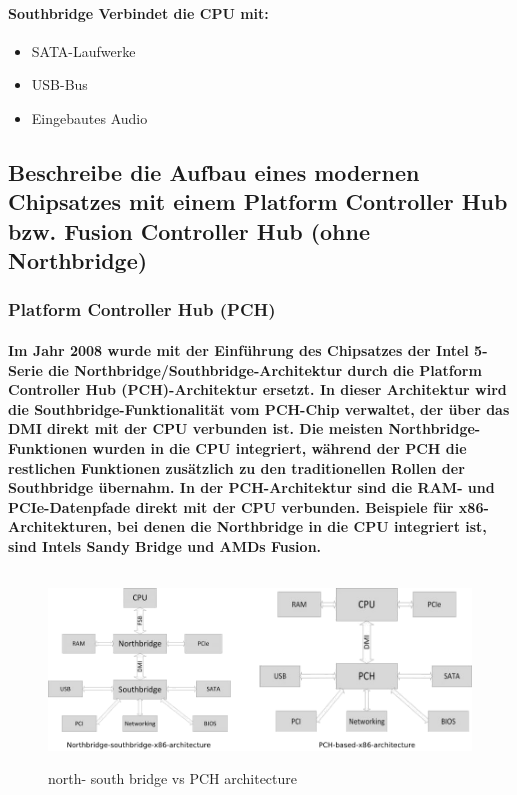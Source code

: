 \documentclass[a4paper]{article}
\begin{document}
    \paragraph{\color{red}Southbridge Verbindet die CPU mit:}
    \begin{itemize}
        \color{magenta}
        \item SATA-Laufwerke
        \item USB-Bus
        \item Eingebautes Audio
    \end{itemize}

    \subsection{\color{red}Beschreibe die Aufbau eines modernen Chipsatzes mit einem Platform Controller Hub bzw. Fusion Controller Hub (ohne Northbridge)}\label{subsec:beschreibe-die-aufbau-eines-modernen-chipsatzes-mit-einem-platform-controller-hub-bzw.-fusion-controller-hub-(ohne-northbridge)}

    \subsubsection{\color{codegreen}Platform Controller Hub (PCH)}
    \paragraph{\color{codegreen}Im Jahr 2008 wurde mit der Einführung des Chipsatzes der Intel 5-Serie die Northbridge/Southbridge-Architektur durch die Platform Controller Hub (PCH)-Architektur ersetzt. In dieser Architektur wird die Southbridge-Funktionalität vom PCH-Chip verwaltet, der über das DMI direkt mit der CPU verbunden ist.\newline
    Die meisten Northbridge-Funktionen wurden in die CPU integriert, während der PCH die restlichen Funktionen zusätzlich zu den traditionellen Rollen der Southbridge übernahm. In der PCH-Architektur sind die RAM- und PCIe-Datenpfade direkt mit der CPU verbunden. Beispiele für x86-Architekturen, bei denen die Northbridge in die CPU integriert ist, sind Intels Sandy Bridge und AMDs Fusion.\newline}

    \begin{center}
        \begin{figure}[H]
            \centering
            \includegraphics[height=5cm]{media/PCHVSN-S-bridge}
            \captionsetup{label-format=empty}
            \caption{north- south bridge vs PCH architecture}\label{fig:architecture}
        \end{figure}
    \end{center}
\end{document}
